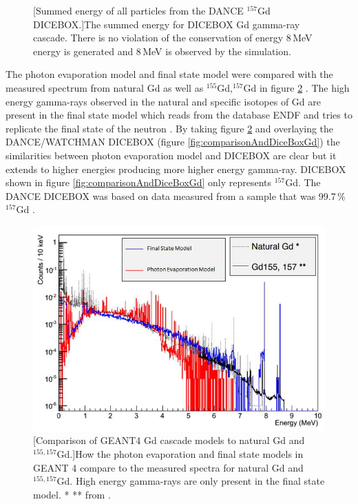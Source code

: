 \begin{figure}[!h]
\begin{minipage}{.45\textwidth}
  [Summed energy of all particles from the DANCE $^{157}$Gd DICEBOX.]{The summed energy for DICEBOX Gd gamma-ray cascade. There is no violation of the conservation of energy 8\,MeV energy is generated and 8\,MeV is observed by the simulation.}
  \label{fig:conservationOfCascadeGd}
  \vspace{0.478cm} %
\end{minipage}
\end{figure}

The photon evaporation model and final state model were compared with the measured spectrum from natural Gd as well as $^{155}$Gd,$^{157}$Gd in figure \ref{fig:comparisonGd} \cite{YuChen_2015}. The high energy gamma-rays observed in the natural and specific isotopes of Gd are present in the final state model which reads from the database ENDF \cite{BROWN20181} and tries to replicate the final state of the neutron \cite{koiTatsumi_2006}. By taking figure \ref{fig:comparisonGd} and overlaying the DANCE/WATCHMAN DICEBOX (figure \ref{fig:comparisonAndDiceBoxGd}) the similarities between photon evaporation model and DICEBOX are clear but it extends to higher energies producing more higher energy gamma-ray. DICEBOX shown in figure \ref{fig:comparisonAndDiceBoxGd} only represents $^{157}$Gd. The DANCE DICEBOX was based on data measured from a sample that was  99.7\,\% $^{157}$Gd \cite{Chyzh_2011}. 

\begin{figure}[!h]
 \centering
 \includegraphics[width=0.7\linewidth]{Chapter4/Figs/Raster/gadolinium/comparisonGd.png}
 [Comparison of GEANT4 Gd cascade models to natural Gd and $^{155,157}$Gd.]{How the photon evaporation and final state models in GEANT 4 compare to the measured spectra for natural Gd and $^{155,157}$Gd. High energy gamma-rays are only present in the final state model.  * \cite{kandlakunta_2012} ** \cite{bollinger_1970} from \cite{YuChen_2015}.} 
 \label{fig:comparisonGd}
\end{figure}

